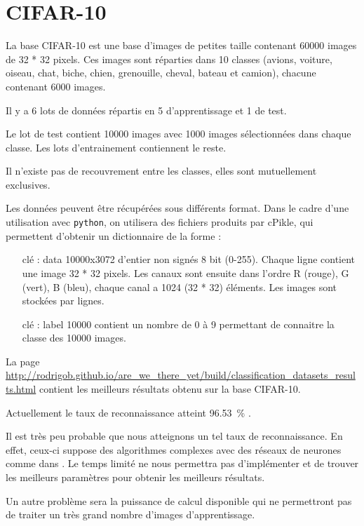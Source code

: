\chapter{CIFAR-10}


La base CIFAR-10 est une base d'images de petites taille contenant 60000 images de 32 * 32 pixels. Ces images sont réparties dans 10 classes (avions, voiture, oiseau, chat, biche, chien, grenouille, cheval, bateau et camion), chacune contenant 6000 images.

Il y a 6 lots de données répartis en 5 d'apprentissage et 1 de test.

Le lot de test contient 10000 images avec 1000 images sélectionnées dans chaque classe. Les lots d'entrainement contiennent le reste.

Il n'existe pas de recouvrement entre les classes, elles sont mutuellement exclusives.


Les données peuvent être récupérées sous différents format. Dans le cadre d'une utilisation avec \texttt{python}, on utilisera des fichiers produits par cPikle, qui permettent d'obtenir un dictionnaire de la forme :

\begin{itemize}
\item[clé : data] 10000x3072 d'entier non signés 8 bit (0-255). Chaque ligne contient une image 32 * 32 pixels. Les canaux sont ensuite dans l'ordre R (rouge), G (vert), B (bleu), chaque canal a 1024 (32 * 32) éléments. Les images sont stockées par lignes.

\item[clé : label] 10000 contient un nombre de 0 à 9 permettant de connaitre la classe des 10000 images.
\end{itemize}

La page \url{http://rodrigob.github.io/are_we_there_yet/build/classification_datasets_results.html} contient les meilleurs résultats obtenu sur la base CIFAR-10. 

Actuellement le taux de reconnaissance atteint 96.53~\% \cite{DBLP:journals/corr/Graham14a}.

Il est très peu probable que nous atteignons un tel taux de reconnaissance. En effet, ceux-ci suppose des algorithmes complexes avec des réseaux de neurones  comme dans \cite{DBLP:journals/corr/Graham14a}. Le temps limité ne nous permettra pas d'implémenter et de trouver les meilleurs paramètres pour obtenir les meilleurs résultats.

Un autre problème sera la puissance de calcul disponible qui ne permettront pas de traiter un très grand nombre d'images d'apprentissage.


